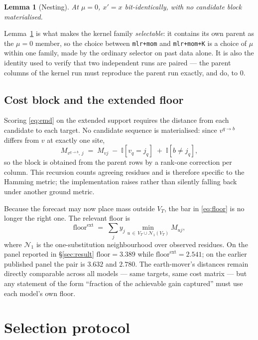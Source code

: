 \documentclass[11pt]{article}
\newtheorem{lemma}{Lemma}
\theoremstyle{remark}
\newcommand{\1}{\mathbf{1}}
\newcommand{\Ind}[1]{\mathbb{I}\!\left[#1\right]}
\newcommand{\VT}{V_T}
\begin{document}
\begin{lemma}[Nesting]\label{lem:nest}
At $\mu = 0$, $x' = x$ bit-identically, with no candidate block materialised.
\end{lemma}

Lemma~\ref{lem:nest} is what makes the kernel family \emph{selectable}: it contains its
own parent as the $\mu = 0$ member, so the choice between \texttt{mlr+mom} and
\texttt{mlr+mom+K} is a choice of $\mu$ within one family, made by the ordinary selector
on past data alone. It is also the identity used to verify that two independent runs are
paired --- the parent columns of the kernel run must reproduce the parent run exactly, and
do, to $0$.

\subsection{Cost block and the extended floor}\label{sec:extfloor}

Scoring \eqref{eq:emd} on the extended support requires the distance from each candidate
to each target. No candidate sequence is materialised: since $v^{q\to b}$ differs from $v$
at exactly one site,
\begin{equation}
  M_{v^{q\to b},\, j} \;=\; M_{vj} \;-\; \Ind{v_q = j_q} \;+\; \Ind{b \neq j_q},
  \label{eq:costrec}
\end{equation}
so the block is obtained from the parent rows by a rank-one correction per column. This
recursion counts agreeing residues and is therefore specific to the Hamming metric; the
implementation raises rather than silently falling back under another ground metric.

Because the forecast may now place mass outside $\VT$, the bar in \eqref{eq:floor} is no
longer the right one. The relevant floor is
\begin{equation}
  \text{floor}^{\mathrm{ext}}
  \;=\; \sum_j y_j \min_{u \,\in\, \VT \cup \mathcal{N}_1(\VT)} M_{uj},
\end{equation}
where $\mathcal{N}_1$ is the one-substitution neighbourhood over observed residues. On the
panel reported in \S\ref{sec:result} $\text{floor} = 3.389$ while
$\text{floor}^{\mathrm{ext}} = 2.541$; on the earlier published panel the pair is $3.632$
and $2.780$. The
earth-mover's distances remain directly comparable across all models --- same targets,
same cost matrix --- but any statement of the form ``fraction of the achievable gain
captured'' must use each model's own floor.

\section{Selection protocol}\label{sec:selection}
\end{document}
